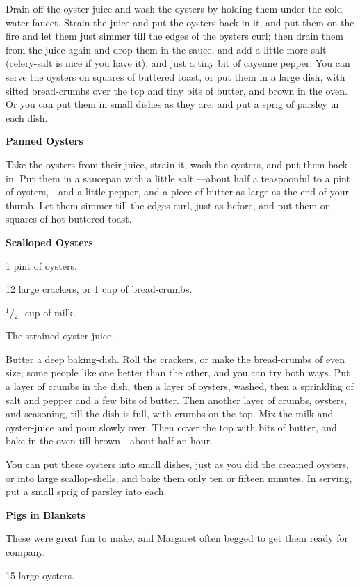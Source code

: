 \documentclass[11pt]{book}
\newcommand{\indpar}{\par\noindent\hspace*{\parindent}}
\newcommand{\ingredient}{\indpar}
\newcommand{\instruction}{\indpar}
\newcommand{\OneHalf}{\ensuremath{{}^1\!\!/\!{}_2\mbox{\ }}}
\newenvironment{RecipeTitle}{\medskip\begin{center}\large\bf }{\end{center}\smallskip}
\begin{document}
  Drain off the oyster-juice and wash the oysters by holding them
under the cold-water faucet.  Strain the juice and put the oysters
back in it, and put them on the fire and let them just simmer
till the edges of the oysters curl; then drain them from the
juice again and drop them in the sauce, and add a little more
salt (celery-salt is nice if you have it), and just a tiny bit
of cayenne pepper.  You can serve the oysters on squares of
buttered toast, or put them in a large dish, with sifted
bread-crumbs over the top and tiny bits of butter, and brown
in the oven.  Or you can put them in small dishes as they are,
and put a sprig of parsley in each dish.
\begin{RecipeTitle}
Panned Oysters\label{panned_oysters}
\end{RecipeTitle}
\instruction
  Take the oysters from their juice, strain it, wash the oysters,
and put them back in.  Put them in a saucepan with a little
salt,---about half a teaspoonful to a pint of oysters,---and
a little pepper, and a piece of butter as large as the end
of your thumb.  Let them simmer till the edges curl, just as
before, and put them on squares of hot buttered toast.
\begin{RecipeTitle}
Scalloped Oysters\label{scalloped_oysters}
\end{RecipeTitle}
\ingredient  1 pint of oysters.
\ingredient  12 large crackers, or 1 cup of bread-crumbs.
\ingredient  \OneHalf cup of milk.
\ingredient  The strained oyster-juice.
\instruction
  Butter a deep baking-dish.  Roll the crackers, or make the
bread-crumbs of even size; some people like one better than
the other, and you can try both ways.  Put a layer of crumbs
in the dish, then a layer of oysters, washed, then a sprinkling
of salt and pepper and a few bits of butter.  Then another
layer of crumbs, oysters, and seasoning, till the dish is full,
with crumbs on the top.  Mix the milk and oyster-juice and
pour slowly over.  Then cover the top with bits of butter,
and bake in the oven till brown---about half an hour.
\instruction
  You can put these oysters into small dishes, just as you
did the creamed oysters, or into large scallop-shells, and
bake them only ten or fifteen minutes.  In serving, put a
small sprig of parsley into each.\pagebreak[4]
\begin{RecipeTitle}
Pigs in Blankets\label{oyster_pigs_in_blankets}
\end{RecipeTitle}
\instruction
  These were great fun to make, and Margaret often begged
to get them ready for company.
\ingredient  15 large oysters.
\end{document}
